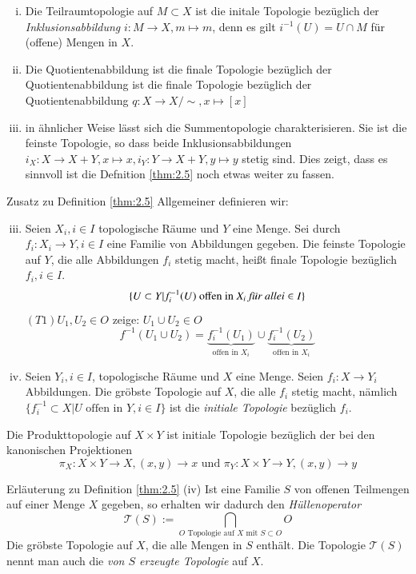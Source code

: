 \documentclass[a4paper,10pt]{scrartcl}
\begin{document}
\begin{exs*}
\begin{enumerate}[(i)]
\item Die Teilraumtopologie auf $M\subset X$ ist die initale Topologie bezüglich der \emph{Inklusionsabbildung} $ i:M\to X,m\mapsto m $, denn es gilt $ i^{-1}(U)=U\cap M $ für (offene) Mengen in $ X $.
\item Die Quotientenabbildung ist die finale Topologie bezüglich der Quotientenabbildung ist die finale Topologie bezüglich der Quotientenabbildung $ q: X\to X/\sim, x\mapsto [x] $
\item in ähnlicher Weise lässt sich die Summentopologie charakterisieren.  Sie ist die feinste Topologie, so dass beide Inklusionsabbildungen
$ i_X:X\to X+Y, x \mapsto x, i_Y: Y\to X+Y,y\mapsto y $ stetig sind.  Dies zeigt, dass es sinnvoll ist die Defnition \ref{thm:2.5} noch etwas weiter zu fassen.
\end{enumerate}
\end{exs*}
\begin{seg}{Zusatz zu Definition \ref{thm:2.5}}\label{thm:2.5(2)}
Allgemeiner definieren wir:
\begin{enumerate}[(i)]
\setcounter{enumi}{2}
\item Seien $X_i, i\in I$ topologische Räume und $ Y $ eine Menge. Sei durch $f_i:X_i\to Y, i\in I$ eine Familie von Abbildungen gegeben. Die feinste Topologie auf $ Y $, die alle Abbildungen $f_i$ stetig macht, heißt finale Topologie bezüglich $ f_i,i\in I $.
\[
\{U\subset Y|f^{-1}_i(U) \text{ offen in }X_i \text{ \emph{für alle}} i\in I\}
\]
$(T1) U_1, U_2\in O$ zeige: $U_1\cup U_2\in O$
\[f^{-1}(U_1\cup U_2)=\underbrace{f^{-1}_i(U_1)}_{\text{offen in } X_i}\cup \underbrace{f^{-1}_i(U_2)}_{\text{offen in } X_i}\]
\item Seien $ Y_i, i\in I $, topologische Räume und $ X $ eine Menge.  Seien $ f_i: X\to Y_i $ Abbildungen.  Die gröbste Topologie auf $ X $, die alle $f_i$ stetig macht, nämlich $\{f^{-1}_i\subset X| U \text{ offen in } Y, i\in I\}$ ist die \emph{initiale Topologie} bezüglich $f_i$. 
\end{enumerate}
\end{seg}
\begin{ex*}
Die Produkttopologie auf $ X\times Y $ ist initiale Topologie bezüglich der bei den kanonischen Projektionen
\[
\pi_X:X\times Y \to X, (x,y)\to x \text{ und } \pi_Y: X\times Y\to Y, (x,y)\to y 
\]
\end{ex*}
\begin{seg}{Erläuterung zu Definition \ref{thm:2.5} (iv)} 
Ist eine Familie $ S $ von offenen Teilmengen auf einer Menge $ X $ gegeben, so erhalten wir dadurch den \emph{Hüllenoperator} 
\[ 
\mathcal T(S):=\bigcap\limits_{ O \text{ Topologie auf } X \text{ mit } S\subset O} O 
\]
Die gröbste Topologie auf $ X $, die alle Mengen in $ S $ enthält. Die Topologie $ \mathcal T(S) $ nennt man auch die \emph{von $ S $ erzeugte Topologie} auf $ X $.
\end{seg}
\end{document}
